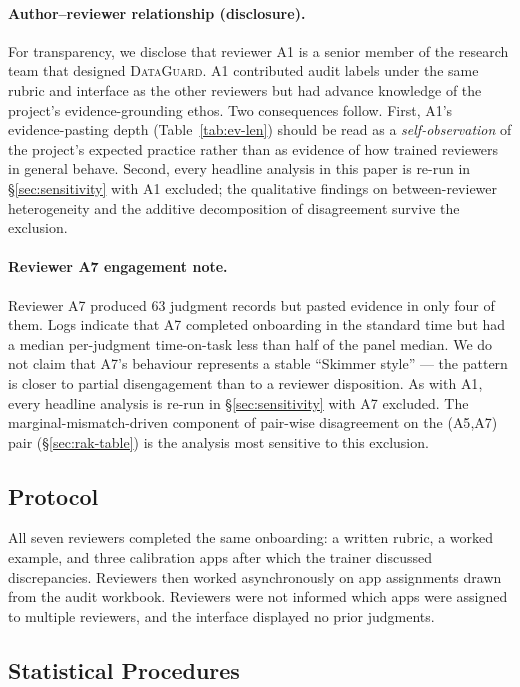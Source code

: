 \documentclass[11pt,a4paper]{article}
\newcommand{\dataguard}{\textsc{DataGuard}}
\newcommand{\Acc}[1]{\textsf{A#1}}
\begin{document}
\paragraph{Author--reviewer relationship (disclosure).}
For transparency, we disclose that reviewer \Acc{1} is a senior
member of the research team that designed \dataguard{}. \Acc{1}
contributed audit labels under the same rubric and interface as the
other reviewers but had advance knowledge of the project's
evidence-grounding ethos. Two consequences follow. First, \Acc{1}'s
evidence-pasting depth (Table~\ref{tab:ev-len}) should be read as a
\emph{self-observation} of the project's expected practice rather
than as evidence of how trained reviewers in general behave. Second,
every headline analysis in this paper is re-run in
\S\ref{sec:sensitivity} with \Acc{1} excluded; the qualitative
findings on between-reviewer heterogeneity and the additive
decomposition of disagreement survive the exclusion.

\paragraph{Reviewer \Acc{7} engagement note.}
Reviewer \Acc{7} produced $63$ judgment records but pasted evidence
in only four of them. Logs indicate that \Acc{7} completed onboarding
in the standard time but had a median per-judgment time-on-task less
than half of the panel median. We do not claim that \Acc{7}'s
behaviour represents a stable ``Skimmer style'' --- the pattern is
closer to partial disengagement than to a reviewer disposition. As
with \Acc{1}, every headline analysis is re-run in
\S\ref{sec:sensitivity} with \Acc{7} excluded. The
marginal-mismatch-driven component of pair-wise disagreement on the
(\Acc{5},\Acc{7}) pair (\S\ref{sec:rak-table}) is the analysis most
sensitive to this exclusion.

\subsection{Protocol}
\label{sec:methods-protocol}

All seven reviewers completed the same onboarding: a written rubric,
a worked example, and three calibration apps after which the trainer
discussed discrepancies. Reviewers then worked asynchronously on app
assignments drawn from the audit workbook. Reviewers were not
informed which apps were assigned to multiple reviewers, and the
interface displayed no prior judgments.

\subsection{Statistical Procedures}
\label{sec:methods-stats}
\end{document}
